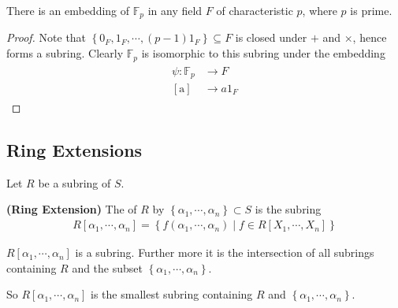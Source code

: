 \documentclass{article}
\newcommand{\bfs}[1]{\textbf{({#1}) }}
\begin{document}
\begin{thma}
There is an embedding of $\mathbb{F}_{p}$ in any field $F$ of characteristic $p$, where $p$ is prime. 
\end{thma} 
\begin{proof}
 Note that $\left\{0_{F}, 1_{F}, \cdots,(p-1) 1_{F}\right\} \subseteq F$ is closed under $+$ and $\times$, hence forms a subring. Clearly $\mathbb{F}_{p}$ is isomorphic to this subring under the embedding
\begin{align*}
\begin{aligned}
\psi: \mathbb{F}_{p} & \longrightarrow F \\
{[\mathrm{a}] } & \longrightarrow a 1_{F}
\end{aligned}
\end{align*}
\end{proof}

\subsection{Ring Extensions}
Let $R$ be a subring of  $S$. 
\begin{defa}\bfs{Ring Extension}\label{def:qondadfd}
The  of $R$ by $\left\{\alpha_{1}, \cdots, \alpha_{n}\right\} \subset S$ is the subring
\begin{align*}
R\left[\alpha_{1}, \cdots, \alpha_{n}\right]=\left\{f\left(\alpha_{1}, \cdots, \alpha_{n}\right) \mid f \in R\left[X_{1}, \cdots, X_{n}\right]\right\}
\end{align*}
\end{defa}
\begin{lema}
 $R\left[\alpha_{1}, \cdots, \alpha_{n}\right]$ is a subring.  Further more it is the intersection of all subrings containing $R$ and the subset $\left\{\alpha_{1}, \cdots, \alpha_{n}\right\}$.
\end{lema}
\begin{rema}
So $R\left[\alpha_{1}, \cdots, \alpha_{n}\right]$ is the smallest subring containing $R$ and $\left\{\alpha_{1}, \cdots, \alpha_{n}\right\}$.
\end{rema}
\end{document}
